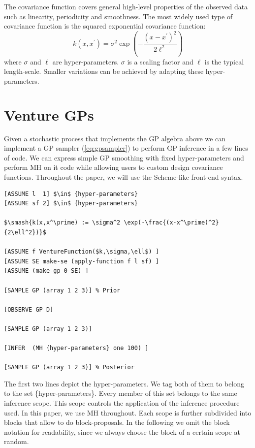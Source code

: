 \documentclass{article} %
\begin{document}
The covariance function covers general high-level properties of the observed data such as linearity, periodicity and smoothness. The most widely used type of covariance function is the squared exponential covariance function:
\begin{equation}
k(x,x^\prime) = \sigma^2 \exp(-\frac{(x-x^\prime)^2}{2\ell^2})
\end{equation}
where $\sigma$ and $\ell$ are hyper-parameters. $\sigma$ is a scaling factor and $\ell$ is the typical length-scale.
Smaller variations can be achieved by adapting these hyper-parameters. 
\section{Venture GPs}
Given a stochastic process that implements the GP algebra above we can implement a GP sampler (\ref{eq:gpsampler}) to perform GP inference in a few lines of code. We can express simple GP smoothing with fixed hyper-parameters and perform MH on it code while allowing users to custom design covariance functions. Throughout the paper, we will use the Scheme-like front-end syntax. 
\begin{minipage}{\linewidth}
\belowcaptionskip=-10pt
\begin{lstlisting}[frame=single,label=alg:gpsmooth,caption=GP Smoothing,mathescape]
[ASSUME l  1] $\in$ {hyper-parameters} 
[ASSUME sf 2] $\in$ {hyper-parameters}

$\smash{k(x,x^\prime) := \sigma^2 \exp(-\frac{(x-x^\prime)^2}{2\ell^2})}$

[ASSUME f VentureFunction($k,\sigma,\ell$) ]
[ASSUME SE make-se (apply-function f l sf) ]
[ASSUME (make-gp 0 SE) ]

[SAMPLE GP (array 1 2 3)] % Prior

[OBSERVE GP D]

[SAMPLE GP (array 1 2 3)] 

[INFER  (MH {hyper-parameters} one 100) ]

[SAMPLE GP (array 1 2 3)] % Posterior

\end{lstlisting}
\end{minipage}

The first two lines depict the hyper-parameters. We tag both of them to belong to the set \{hyper-parameters\}. Every member of this set belongs to the same inference scope. This scope controls the application of the inference procedure used. In this paper, we use MH throughout. Each scope is further subdivided into blocks that allow to do block-proposals. In the following we omit the block notation for readability, since we always choose the block of a certain scope at random.
\end{document}
